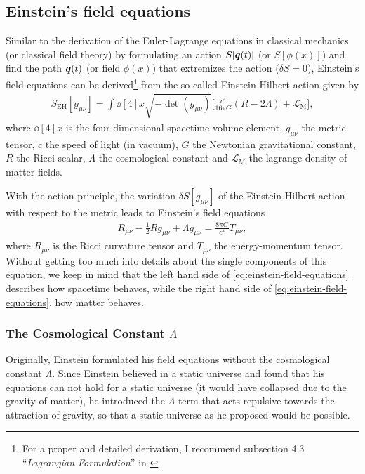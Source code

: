 \subsection{Einstein's field equations}

\noindent Similar to the derivation of the Euler-Lagrange equations in classical mechanics (or classical field theory) by formulating an action $S[\vb*{q}(t)]$ (or $S[\phi(x)]$) and find the path $\vb*{q}(t)$ (or field $\phi(x)$) that extremizes the action ($\delta S = 0$), Einstein's field equations can be derived\footnote{For a proper and detailed derivation, I recommend subsection 4.3 ``\textit{Lagrangian Formulation}'' in \cite[p. 159]{SeanCarroll2019}} from the so called Einstein-Hilbert action given by
\begin{align}
    S_{\text{EH}}[g_{\mu\nu}] = \int \dd[4]{x} \sqrt{-\det(g_{\mu\nu})} \biggl[\frac{c^4}{16\pi G}(R - 2\Lambda) + \mathcal{L}_{\text{M}} \biggr], 
\end{align}
where $\dd[4]{x}$ is the four dimensional spacetime-volume element, $g_{\mu\nu}$ the metric tensor, $c$ the speed of light (in vacuum), $G$ the Newtonian gravitational constant, $R$ the Ricci scalar, $\Lambda$ the cosmological constant and $\mathcal{L}_{\text{M}}$ the lagrange density of matter fields. 

\noindent With the action principle, the variation $\delta S[g_{\mu\nu}]$ of the Einstein-Hilbert action with respect to the metric leads to Einstein's field equations
\begin{align}
    R_{\mu\nu} - \frac{1}{2}R g_{\mu\nu} + \Lambda g_{\mu\nu} = \frac{8\pi G}{c^4}T_{\mu \nu}, \label{eq:einstein-field-equations}
\end{align}
where $R_{\mu\nu}$ is the Ricci curvature tensor and $T_{\mu\nu}$ the energy-momentum tensor. \\
\noindent Without getting too much into details about the single components of this equation, we keep in mind that the left hand side of \eqref{eq:einstein-field-equations} describes how spacetime behaves, while the right hand side of \eqref{eq:einstein-field-equations}, how matter behaves.

\subsubsection{The Cosmological Constant $\Lambda$}

\noindent Originally, Einstein formulated his field equations without the cosmological constant $\Lambda$. Since Einstein believed in a static universe and found that his equations can not hold for a static universe (it would have collapsed due to the gravity of matter), he introduced the $\Lambda$ term that acts repulsive towards the attraction of gravity, so that a static universe as he proposed would be possible. \\


